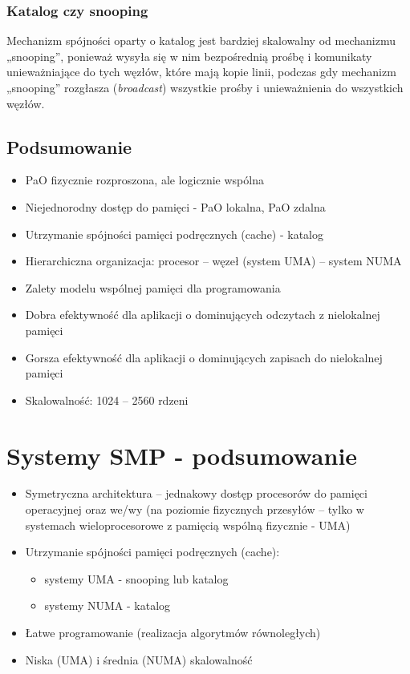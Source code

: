 		\subsubsection{Katalog czy snooping}
			Mechanizm spójności oparty o katalog jest bardziej skalowalny od mechanizmu „snooping”, ponieważ wysyła się w nim bezpośrednią prośbę i komunikaty unieważniające do tych węzłów, które mają kopie linii, podczas gdy mechanizm „snooping” rozgłasza (\emph{broadcast}) wszystkie prośby i unieważnienia do wszystkich węzłów.
			
	\subsection{Podsumowanie}
		\begin{itemize}
			\item PaO fizycznie rozproszona, ale logicznie wspólna
			\item Niejednorodny dostęp do pamięci - PaO lokalna, PaO zdalna
			\item Utrzymanie spójności pamięci podręcznych (cache) - katalog
			\item Hierarchiczna organizacja: procesor – węzeł (system UMA) – system NUMA
			\item Zalety modelu wspólnej pamięci dla programowania
			\item Dobra efektywność dla aplikacji o dominujących odczytach z nielokalnej pamięci
			\item Gorsza efektywność dla aplikacji o dominujących zapisach do nielokalnej pamięci
			\item Skalowalność: 1024 – 2560 rdzeni
		\end{itemize}
		
\section{Systemy SMP - podsumowanie}
	\begin{itemize}
		\item Symetryczna architektura – jednakowy dostęp procesorów do pamięci operacyjnej oraz we/wy (na poziomie fizycznych przesyłów –
		tylko w systemach wieloprocesorowe z pamięcią wspólną fizycznie - UMA)
		\item Utrzymanie spójności pamięci podręcznych (cache):
		\begin{itemize}
			\item systemy UMA - snooping lub katalog
			\item systemy NUMA - katalog
		\end{itemize}
		\item Łatwe programowanie (realizacja algorytmów równoległych)
		\item Niska (UMA) i średnia (NUMA) skalowalność
	\end{itemize}

